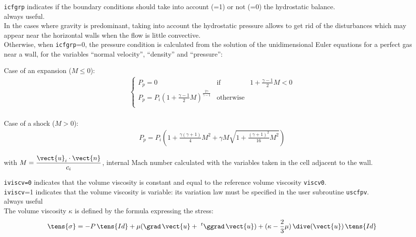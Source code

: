 {\texttt{icfgrp} indicates if the boundary
conditions should take into account (=1) or not (=0) the hydrostatic balance.\\
always useful.\\
In the cases where gravity is predominant, taking into account the hydrostatic
pressure allows to get rid of the disturbances which may appear near the
horizontal walls when the flow is little convective.\\
%
Otherwise, when \texttt{icfgrp}=0, the pressure condition is calculated
from the solution of the unidimensional Euler equations for a perfect
gas near a wall, for the variables ``normal velocity'', ``density'' and
``pressure'':
\vspace{0.2cm}
\begin{list}{}{}
\item Case of an expansion ($M \leqslant 0$):\\
$$
\begin{array}{l}
\left\{\begin{array}{lll}
P_p=0 & \text{if} & 1 + \displaystyle\frac{\gamma-1}{2}M<0\\
P_p = P_i \left(1 + \displaystyle\frac{\gamma-1}{2}M\right)
^{\frac{2\gamma}{\gamma-1}} & \text{otherwise}\\
\end{array}\right.\\
\end{array}
$$

\item Case of a shock ($M > 0$):\\
$$
\begin{array}{l}
P_p = P_i \left(1 + \displaystyle\frac{\gamma(\gamma+1)}{4}M^2
+\gamma M \displaystyle\sqrt{1+\displaystyle\frac{(\gamma+1)^2}{16}M^2}\right)
\end{array}
$$

with $M = \displaystyle\frac{\vect{u}_i \cdot \vect{n}}{c_i}$, internal
      Mach number calculated with the variables taken in the cell
      adjacent to the wall.\\

\end{list}
}

{\texttt{iviscv=0} indicates that
the volume viscosity is constant and equal to the reference volume viscosity
\texttt{viscv0}.\\
\texttt{iviscv}=1 indicates that the volume viscosity is variable: its
variation law must be specified in the user subroutine \texttt{uscfpv}.\\
always useful\\
The volume viscosity $\kappa$ is defined by the formula expressing the stress:
\begin{equation}
   \tens{\sigma} = -P\,\tens{Id} + \mu (\grad\,\vect{u} +  \ ^{t}\ggrad\,\vect{u})
           +(\kappa-\frac{2}{3}\mu)\,\dive(\vect{u})\,\tens{Id}
\end{equation}
}

